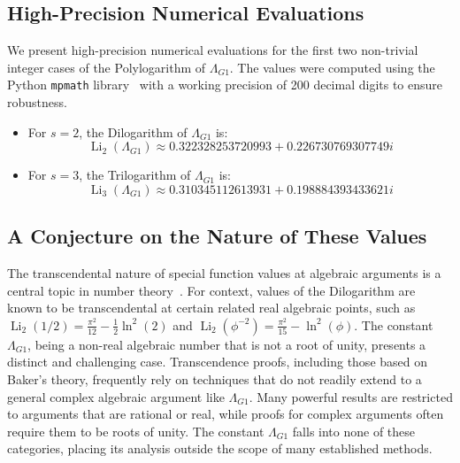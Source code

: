 \documentclass{amsart}
\theoremstyle{plain}
\theoremstyle{definition}
\theoremstyle{remark}
\DeclareMathOperator{\Li}{Li}
\newcommand{\LambdaG}{\Lambda_{G1}}
\newcommand{\phiG}{\phi}
\begin{document}
\subsection{High-Precision Numerical Evaluations}
We present high-precision numerical evaluations for the first two non-trivial integer cases of the Polylogarithm of $\LambdaG$. The values were computed using the Python \texttt{mpmath} library~\cite{mpmath} with a working precision of 200 decimal digits to ensure robustness.
\begin{itemize}
    \item For $s=2$, the Dilogarithm of $\LambdaG$ is:
    \[ \Li_2(\LambdaG) \approx 0.322328253720993 + 0.226730769307749i \]
    
    \item For $s=3$, the Trilogarithm of $\LambdaG$ is:
    \[ \Li_3(\LambdaG) \approx 0.310345112613931 + 0.198884393433621i \]
\end{itemize}

\subsection{A Conjecture on the Nature of These Values}
The transcendental nature of special function values at algebraic arguments is a central topic in number theory~\cite{Baker}. For context, values of the Dilogarithm are known to be transcendental at certain related real algebraic points, such as $\Li_2(1/2) = \frac{\pi^2}{12} - \frac{1}{2}\ln^2(2)$ and $\Li_2(\phiG^{-2}) = \frac{\pi^2}{15} - \ln^2(\phiG)$. The constant $\LambdaG$, being a non-real algebraic number that is not a root of unity, presents a distinct and challenging case. Transcendence proofs, including those based on Baker's theory, frequently rely on techniques that do not readily extend to a general complex algebraic argument like $\LambdaG$. Many powerful results are restricted to arguments that are rational or real, while proofs for complex arguments often require them to be roots of unity. The constant $\LambdaG$ falls into none of these categories, placing its analysis outside the scope of many established methods.
\end{document}
